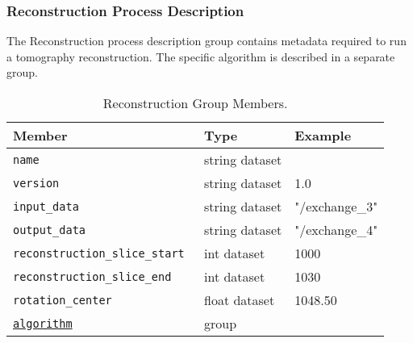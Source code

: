 \subsubsection{Reconstruction Process Description}
\label{table:reconstruction}

The Reconstruction process description group contains metadata required to run a tomography reconstruction. The specific algorithm is described in a separate group.

\begin{table}[h!]\sffamily \footnotesize
\caption{Reconstruction Group Members.}
\centering
{}
\begin{tabular}{l l l}

\toprule
\bfseries Member     & \bfseries Type & \bfseries Example \\
\midrule
\tt{name} & string dataset &  \\  
\tt{version}  & string dataset  & 1.0 \\
\tt{input\_data} &  string dataset & "/exchange\_3" \\
\tt{output\_data} & string dataset & "/exchange\_4" \\
\tt{reconstruction\_slice\_start} & int dataset &  1000\\
\tt{reconstruction\_slice\_end} & int dataset &  1030\\
\tt{rotation\_center} & float dataset & 1048.50 \\
\hyperref[table:algorithm]{\tt{algorithm}} & group &  \\
\bottomrule
\end{tabular}
\end{table}

